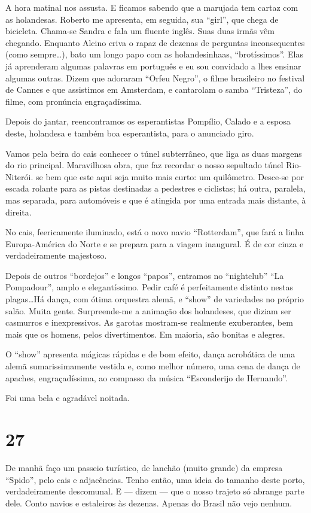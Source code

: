 A hora matinal nos assusta. E ficamos sabendo que a marujada tem cartaz com as holandesas. Roberto me apresenta, em seguida, sua ``girl'', que chega de bicicleta. Chama-se Sandra e fala um fluente inglês. Suas duas irmãs vêm chegando. Enquanto Alcino criva o rapaz de dezenas de perguntas inconsequentes (como sempre\ldots), bato um longo papo com as holandesinhaas, ``brotíssimos''. Elas já aprenderam algumas palavras em português e eu sou convidado a lhes ensinar algumas outras. Dizem que adoraram ``Orfeu Negro'', o filme brasileiro no festival de Cannes e que assistimos em Amsterdam, e cantarolam o samba ``Tristeza'', do filme, com pronúncia engraçadíssima.

Depois do jantar, reencontramos os esperantistas Pompílio, Calado e a esposa deste, holandesa e também boa esperantista, para o anunciado giro.

Vamos pela beira do cais conhecer o túnel subterrâneo, que liga as duas margens do rio principal. Maravilhosa obra, que faz recordar o nosso sepultado túnel Rio-Niterói. se bem que este aqui seja muito mais curto: um quilômetro. Desce-se por escada rolante para as pistas destinadas a pedestres e ciclistas; há outra, paralela, mas separada, para automóveis e que é atingida por uma entrada mais distante, à direita.

No cais, feericamente iluminado, está o novo navio ``Rotterdam'', que fará a linha Europa-América do Norte e se prepara para a viagem inaugural. É de cor cinza e verdadeiramente majestoso.

Depois de outros ``bordejos'' e longos ``papos'', entramos no ``nightclub'' ``La Pompadour'', amplo e elegantíssimo. Pedir café é perfeitamente distinto nestas plagas\ldots Há dança, com ótima orquestra alemã, e ``show'' de variedades no próprio salão. Muita gente. Surpreende-me a animação dos holandeses, que diziam ser casmurros e inexpressivos. As garotas mostram-se realmente exuberantes, bem mais que os homens, pelos divertimentos. Em maioria, são bonitas e alegres.

O ``show'' apresenta mágicas rápidas e de bom efeito, dança acrobática de uma alemã sumarissimamente vestida e, como melhor número, uma cena de dança de apaches, engraçadíssima, ao compasso da música ``Esconderijo de Hernando''.

Foi uma bela e agradável noitada.

\section*{27 \adfflatleafright {}}
De manhã faço um passeio turístico, de lanchão (muito grande) da empresa ``Spido'', pelo cais e adjacências. Tenho então, uma ideia do tamanho deste porto, verdadeiramente descomunal. E --- dizem --- que o nosso trajeto só abrange parte dele. Conto navios e estaleiros às dezenas. Apenas do Brasil não vejo nenhum.

